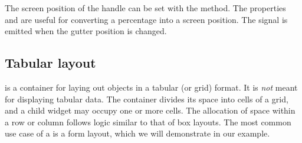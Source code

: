 The screen position of the handle can be set with the
 method.  The properties
 and  are useful for converting
a percentage into a screen position. The  signal
is emitted when the gutter position is changed.

\subsection{Tabular layout}
\label{sec:RGtk2:gtkTable}

 is a container for laying out objects in a tabular
(or grid) format. It is \emph{not} meant for displaying tabular
data. The container divides its space into cells of a grid, and a
child widget may occupy one or more cells. The allocation of space
within a row or column follows logic similar to that of box
layouts. The most common use case of a  is a form
layout, which we will demonstrate in our example.

